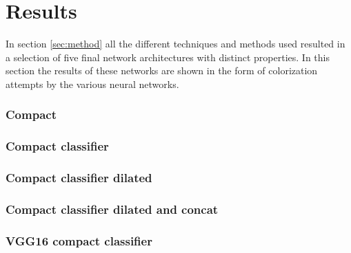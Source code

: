 \section{Results}\label{sec:results}

In section \ref{sec:method} all the different techniques and methods used resulted in a selection of five final network architectures with distinct properties. In this section the results of these networks are shown in the form of colorization attempts by the various neural networks. 




\subsubsection{Compact}



\subsubsection{Compact classifier}


\subsubsection{Compact classifier dilated}


\subsubsection{Compact classifier dilated and concat}


\subsubsection{VGG16 compact classifier}
